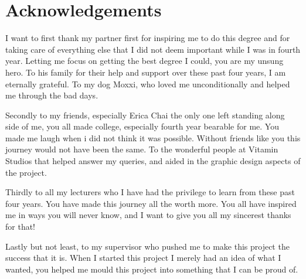 \newpage
\chapter*{Acknowledgements}

I want to first thank my partner first for inspiring me to do this degree and for taking care of everything else that I did not deem important while I was in fourth year. Letting me focus on getting the best degree I could, you are my unsung hero. To his family for their help and support over these past four years, I am eternally grateful. To my dog Moxxi, who loved me unconditionally and helped me through the bad days. 

Secondly to my friends, especially Erica Chai the only one left standing along side of me, you all made college, especially fourth year bearable for me. You made me laugh when i did not think it was possible. Without friends like you this journey would not have been the same. To the wonderful people at Vitamin Studios that helped answer my queries, and aided in the graphic design aspects of the project. 

Thirdly to all my lecturers who I have had the privilege to learn from these past four years. You have made this journey all the worth more. You all have inspired me in ways you will never know, and I want to give you all my sincerest thanks for that!

Lastly but not least, to my supervisor who pushed me to make this project the success that it is. When I started this project I merely had an idea of what I wanted, you helped me mould this project into something that I can be proud of. 
